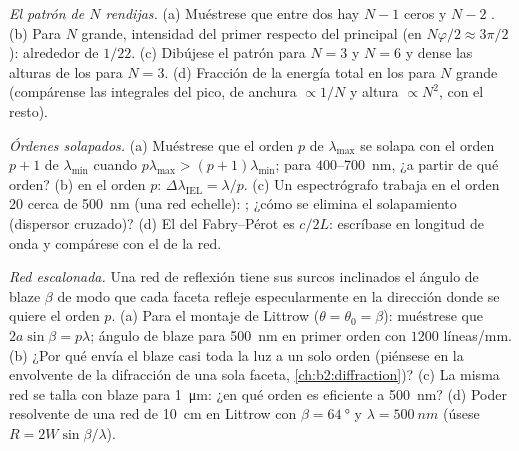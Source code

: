 \begin{exercise}[$\star\star$]\label{exo:b2:gratings:5}
\emph{El patrón de $N$ rendijas.} (a) Muéstrese que entre dos 
hay $N - 1$ ceros y $N - 2$ . (b) Para $N$ grande,
intensidad del primer  respecto del principal
(en $N\varphi/2 \approx 3\pi/2$): alrededor de $1/22$. (c) Dibújese el patrón para
$N = 3$ y $N = 6$ y dense las alturas de los  para
$N = 3$. (d) Fracción de la energía total en los  para
$N$ grande (compárense las integrales del pico, de anchura $\propto 1/N$ y altura
$\propto N^2$, con el resto).
\end{exercise}

\begin{exercise}[$\star\star$]\label{exo:b2:gratings:6}
\emph{Órdenes solapados.} (a) Muéstrese que el orden $p$ de $\lambda_{\max}$ se solapa con el
orden $p + 1$ de $\lambda_{\min}$ cuando $p\lambda_{\max} > (p + 1)\lambda_{\min}$; para $400$--\qty{700}{nm},
¿a partir de qué orden? (b)  en el orden $p$: $\Delta\lambda_{\text{IEL}}
= \lambda/p$. (c) Un espectrógrafo trabaja en el orden $20$ cerca de \qty{500}{nm} (una
red echelle): ; ¿cómo se elimina el solapamiento
(dispersor cruzado)? (d) El  del Fabry--Pérot es $c/2L$:
escríbase en longitud de onda y compárese con el de la red.
\end{exercise}

\begin{exercise}[$\star\star$]\label{exo:b2:gratings:7}
\emph{Red escalonada.} Una red de reflexión tiene sus surcos inclinados
el ángulo de blaze $\beta$ de modo que cada faceta refleje especularmente en la
dirección donde se quiere el orden $p$. (a) Para el montaje de Littrow
($\theta = \theta_0 = \beta$): muéstrese que $2a\sin\beta = p\lambda$; ángulo de blaze para \qty{500}{nm}
en primer orden con $1200$ líneas/mm. (b) ¿Por qué envía el blaze casi toda la
luz a un solo orden (piénsese en la envolvente de la difracción de una
sola faceta, \cref{ch:b2:diffraction})? (c) La misma red se talla con blaze
para \qty{1}{\micro m}: ¿en qué orden es eficiente a \qty{500}{nm}? (d)
Poder resolvente de una red de \qty{10}{cm} en Littrow con $\beta = \qty{64}{\degree}$ y
$\lambda = \qty{500}{nm}$ (úsese $R = 2W\sin\beta/\lambda$).
\end{exercise}

